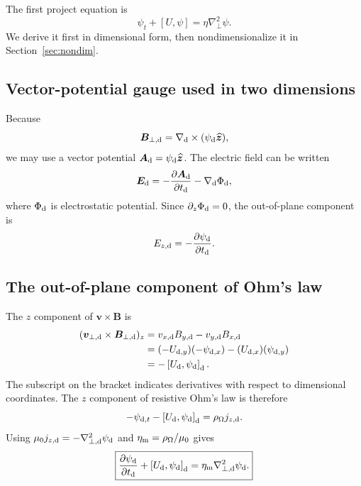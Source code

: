 \documentclass[11pt]{article}
\newcommand{\vect}[1]{\bm{#1}}
\newcommand{\bracket}[2]{\left[#1,#2\right]}
\newcommand{\Lap}{\nabla_{\!\perp}^{2}}
\begin{document}
The first project equation is
\begin{equation}
\psi_t+\bracket{U}{\psi}=\eta\Lap\psi.
\label{eq:fluxproject_preview}
\end{equation}
We derive it first in dimensional form, then nondimensionalize it in Section~\ref{sec:nondim}.

\subsection{Vector-potential gauge used in two dimensions}

Because
\begin{equation}
\vect{B}_{\perp,\rm d}=\nabla_{\rm d}\times
(\psi_{\rm d}\widehat{\vect{z}}),
\end{equation}
we may use a vector potential $\vect{A}_{\rm d}=\psi_{\rm d}\widehat{\vect{z}}$. The electric field can be written
\begin{equation}
\vect{E}_{\rm d}
=-\frac{\partial\vect{A}_{\rm d}}{\partial t_{\rm d}}
-\nabla_{\rm d}\Phi_{\rm d},
\end{equation}
where $\Phi_{\rm d}$ is electrostatic potential. Since $\partial_z\Phi_{\rm d}=0$, the out-of-plane component is
\begin{equation}
E_{z,\rm d}=-\frac{\partial\psi_{\rm d}}{\partial t_{\rm d}}.
\label{eq:Ezpsit}
\end{equation}

\subsection{The out-of-plane component of Ohm's law}

The $z$ component of $\vect{v}\times\vect{B}$ is
\begin{align}
(\vect{v}_{\perp,\rm d}\times\vect{B}_{\perp,\rm d})_z
&=v_{x,\rm d}B_{y,\rm d}-v_{y,\rm d}B_{x,\rm d}\\
&=(-U_{{\rm d},y})(-\psi_{{\rm d},x})
-(U_{{\rm d},x})(\psi_{{\rm d},y})\\
&=-\bracket{U_{\rm d}}{\psi_{\rm d}}_{\rm d}.
\end{align}
The subscript on the bracket indicates derivatives with respect to dimensional coordinates. The $z$ component of resistive Ohm's law is therefore
\begin{equation}
-\psi_{{\rm d},t}
-\bracket{U_{\rm d}}{\psi_{\rm d}}_{\rm d}
=\rho_\Omega j_{z,\rm d}.
\end{equation}
Using $\mu_0j_{z,\rm d}=-\nabla_{\perp,\rm d}^2\psi_{\rm d}$ and $\eta_{\rm m}=\rho_\Omega/\mu_0$ gives
\begin{equation}
\boxed{
\frac{\partial\psi_{\rm d}}{\partial t_{\rm d}}
+\bracket{U_{\rm d}}{\psi_{\rm d}}_{\rm d}
=\eta_{\rm m}\nabla_{\perp,\rm d}^{2}\psi_{\rm d}.}
\label{eq:flux_dim}
\end{equation}
\end{document}
